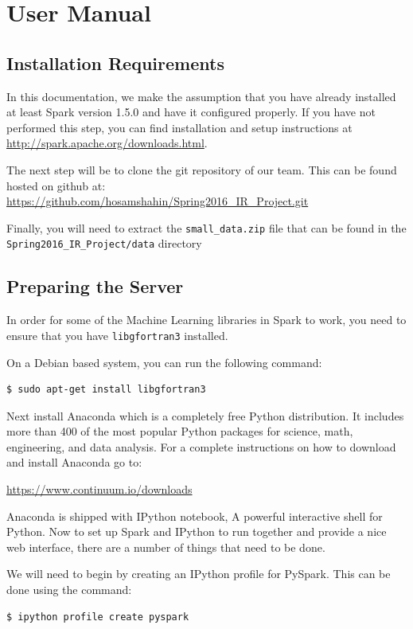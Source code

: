 \chapter{User Manual}\label{ch:userManual}
\lstset{basicstyle=\ttfamily}

\section{Installation Requirements}
In this documentation, we make the assumption that you have already installed at least Spark version 1.5.0 and have it configured properly. If you have not performed this step, you can find installation and setup instructions at \url{http://spark.apache.org/downloads.html}.

The next step will be to clone the git repository of our team. This can be found hosted on github at: \url{https://github.com/hosamshahin/Spring2016_IR_Project.git}

Finally, you will need to extract the \texttt{small\_data.zip} file that can be found in the\\ \texttt{Spring2016\_IR\_Project/data} directory

\section{Preparing the Server}
In order for some of the Machine Learning libraries in Spark to work, you need to ensure that you have \texttt{libgfortran3} installed.

On a Debian based system, you can run the following command:
\begin{lstlisting}[language=bash]
  $ sudo apt-get install libgfortran3
\end{lstlisting}

Next install Anaconda which is a completely free Python distribution. It includes more than 400 of the most popular Python packages for science, math, engineering, and data analysis. For a complete instructions on how to download and install Anaconda go to:

\url{https://www.continuum.io/downloads}

Anaconda is shipped with IPython notebook, A powerful interactive shell for Python. Now to set up Spark and IPython to run together and provide a nice web interface, there are a number of things that need to be done.

We will need to begin by creating an IPython profile for PySpark. This can be done using the command:
\begin{lstlisting}[language=bash]
  $ ipython profile create pyspark
\end{lstlisting}

